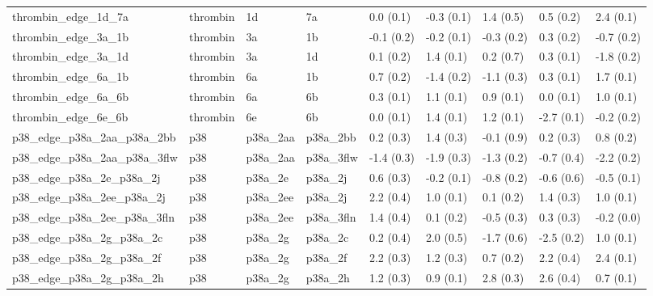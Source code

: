 \begin{tabular}{lllllllll}
thrombin\_edge\_1d\_7a              &  thrombin &          1d &          7a &   0.0 (0.1) &        -0.3 (0.1) &   1.4 (0.5) &   0.5 (0.2) &   2.4 (0.1) \\
thrombin\_edge\_3a\_1b              &  thrombin &          3a &          1b &  -0.1 (0.2) &        -0.2 (0.1) &  -0.3 (0.2) &   0.3 (0.2) &  -0.7 (0.2) \\
thrombin\_edge\_3a\_1d              &  thrombin &          3a &          1d &   0.1 (0.2) &         1.4 (0.1) &   0.2 (0.7) &   0.3 (0.1) &  -1.8 (0.2) \\
thrombin\_edge\_6a\_1b              &  thrombin &          6a &          1b &   0.7 (0.2) &        -1.4 (0.2) &  -1.1 (0.3) &   0.3 (0.1) &   1.7 (0.1) \\
thrombin\_edge\_6a\_6b              &  thrombin &          6a &          6b &   0.3 (0.1) &         1.1 (0.1) &   0.9 (0.1) &   0.0 (0.1) &   1.0 (0.1) \\
thrombin\_edge\_6e\_6b              &  thrombin &          6e &          6b &   0.0 (0.1) &         1.4 (0.1) &   1.2 (0.1) &  -2.7 (0.1) &  -0.2 (0.2) \\
p38\_edge\_p38a\_2aa\_p38a\_2bb       &       p38 &    p38a\_2aa &    p38a\_2bb &   0.2 (0.3) &         1.4 (0.3) &  -0.1 (0.9) &   0.2 (0.3) &   0.8 (0.2) \\
p38\_edge\_p38a\_2aa\_p38a\_3flw      &       p38 &    p38a\_2aa &   p38a\_3flw &  -1.4 (0.3) &        -1.9 (0.3) &  -1.3 (0.2) &  -0.7 (0.4) &  -2.2 (0.2) \\
p38\_edge\_p38a\_2e\_p38a\_2j         &       p38 &     p38a\_2e &     p38a\_2j &   0.6 (0.3) &        -0.2 (0.1) &  -0.8 (0.2) &  -0.6 (0.6) &  -0.5 (0.1) \\
p38\_edge\_p38a\_2ee\_p38a\_2j        &       p38 &    p38a\_2ee &     p38a\_2j &   2.2 (0.4) &         1.0 (0.1) &   0.1 (0.2) &   1.4 (0.3) &   1.0 (0.1) \\
p38\_edge\_p38a\_2ee\_p38a\_3fln      &       p38 &    p38a\_2ee &   p38a\_3fln &   1.4 (0.4) &         0.1 (0.2) &  -0.5 (0.3) &   0.3 (0.3) &  -0.2 (0.0) \\
p38\_edge\_p38a\_2g\_p38a\_2c         &       p38 &     p38a\_2g &     p38a\_2c &   0.2 (0.4) &         2.0 (0.5) &  -1.7 (0.6) &  -2.5 (0.2) &   1.0 (0.1) \\
p38\_edge\_p38a\_2g\_p38a\_2f         &       p38 &     p38a\_2g &     p38a\_2f &   2.2 (0.3) &         1.2 (0.3) &   0.7 (0.2) &   2.2 (0.4) &   2.4 (0.1) \\
p38\_edge\_p38a\_2g\_p38a\_2h         &       p38 &     p38a\_2g &     p38a\_2h &   1.2 (0.3) &         0.9 (0.1) &   2.8 (0.3) &   2.6 (0.4) &   0.7 (0.1) \\

\end{tabular}
